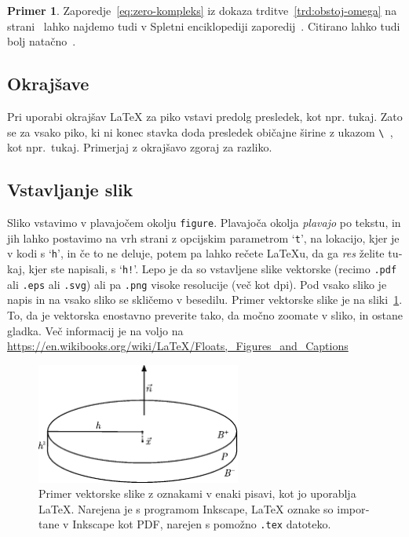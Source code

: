 \documentclass[12pt,a4paper,twoside]{article}
\theoremstyle{definition} %
\newtheorem{primer}[definicija]{Primer}
\theoremstyle{plain} %
\numberwithin{equation}{section}  %
\begin{document}
\begin{otherlanguage}{slovene}
\begin{primer}
  Zaporedje~\eqref{eq:zero-kompleks} iz dokaza trditve~\ref{trd:obstoj-omega} na
  strani~\pageref{trd:obstoj-omega} lahko najdemo tudi v Spletni enciklopediji zaporedij~\cite{oeis}.
  Citirano lahko tudi bolj natačno~\cite[trditev 2.1, str.\ 23]{lebedev2009introduction}.
\end{primer}

\subsection{Okrajšave}
Pri uporabi okrajšav \LaTeX{} za piko vstavi predolg presledek, kot npr. tukaj. Zato se za vsako
piko, ki ni konec stavka doda presledek običajne širine z ukazom \verb*|\ |, kot npr.\ tukaj.
Primerjaj z okrajšavo zgoraj za razliko.

\subsection{Vstavljanje slik}
Sliko vstavimo v plavajočem okolju \texttt{figure}. Plavajoča okolja \emph{plavajo} po tekstu, in
jih lahko postavimo na vrh strani z opcijskim parametrom `\texttt{t}', na lokacijo, kjer je v kodi s
`\texttt{h}', in če to ne deluje, potem pa lahko rečete \LaTeX u, da ga \emph{res} želite tukaj,
kjer ste napisali, s `\texttt{h!}'. Lepo je da so vstavljene slike vektorske (recimo \texttt{.pdf}
ali \texttt{.eps} ali \texttt{.svg}) ali pa \texttt{.png} visoke resolucije (več kot
\unit[300]{dpi}).  Pod vsako sliko je napis in na vsako sliko se skličemo v besedilu. Primer
vektorske slike je na sliki~\ref{fig:sample}. To, da je vektorska enostavno preverite tako, da močno
zoomate v sliko, in ostane gladka. Več informacij je na voljo na
\url{https://en.wikibooks.org/wiki/LaTeX/Floats,_Figures_and_Captions}

\begin{figure}[h]
  \centering
  \includegraphics[width=0.6\textwidth]{images/sample.pdf}
  \caption[Primer vektorske slike.]{Primer vektorske slike z oznakami v enaki pisavi, kot jo
     uporablja \LaTeX{}.  Narejena je s programom Inkscape, \LaTeX{} oznake so importane v
     Inkscape kot PDF, narejen s pomožno \texttt{.tex} datoteko.}
  \label{fig:sample}
\end{figure}

\end{otherlanguage}
\end{document}
